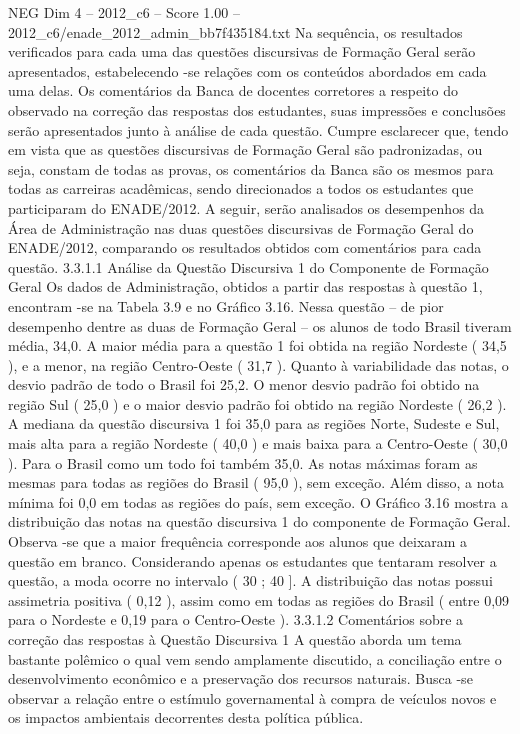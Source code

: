 \begin{textsample}{NEG Dim 4 – 2012\_c6 – Score 1.00 – 2012\_c6/enade\_2012\_admin\_bb7f435184.txt}
Na sequência, os resultados verificados para cada uma das questões discursivas de Formação Geral serão apresentados, estabelecendo -se relações com os conteúdos abordados em cada uma delas.
Os comentários da Banca de docentes corretores a respeito do observado na correção das respostas dos estudantes, suas impressões e conclusões serão apresentados junto à análise de cada questão.
Cumpre esclarecer que, tendo em vista que as questões discursivas de Formação Geral são padronizadas, ou seja, constam de todas as provas, os comentários da Banca são os mesmos para todas as carreiras acadêmicas, sendo direcionados a todos os estudantes que participaram do ENADE/2012.
A seguir, serão analisados os desempenhos da Área de Administração nas duas questões discursivas de Formação Geral do ENADE/2012, comparando os resultados obtidos com comentários para cada questão. 3.3.1.1 Análise da Questão Discursiva 1 do Componente de Formação Geral Os dados de Administração, obtidos a partir das respostas à questão 1, encontram -se na Tabela 3.9 e no Gráfico 3.16.
Nessa questão – de pior desempenho dentre as duas de Formação Geral – os alunos de todo Brasil tiveram média, 34,0.
A maior média para a questão 1 foi obtida na região Nordeste ( 34,5 ), e a menor, na região Centro-Oeste ( 31,7 ).
Quanto à variabilidade das notas, o desvio padrão de todo o Brasil foi 25,2.
O menor desvio padrão foi obtido na região Sul ( 25,0 ) e o maior desvio padrão foi obtido na região Nordeste ( 26,2 ).
A mediana da questão discursiva 1 foi 35,0 para as regiões Norte, Sudeste e Sul, mais alta para a região Nordeste ( 40,0 ) e mais baixa para a Centro-Oeste ( 30,0 ).
Para o Brasil como um todo foi também 35,0.
As notas máximas foram as mesmas para todas as regiões do Brasil ( 95,0 ), sem exceção.
Além disso, a nota mínima foi 0,0 em todas as regiões do país, sem exceção.
O Gráfico 3.16 mostra a distribuição das notas na questão discursiva 1 do componente de Formação Geral.
Observa -se que a maior frequência corresponde aos alunos que deixaram a questão em branco.
Considerando apenas os estudantes que tentaram resolver a questão, a moda ocorre no intervalo ( 30 ; 40 ].
A distribuição das notas possui assimetria positiva ( 0,12 ), assim como em todas as regiões do Brasil ( entre 0,09 para o Nordeste e 0,19 para o Centro-Oeste ). 3.3.1.2 Comentários sobre a correção das respostas à Questão Discursiva 1 A questão aborda um tema bastante polêmico o qual vem sendo amplamente discutido, a conciliação entre o desenvolvimento econômico e a preservação dos recursos naturais.
Busca -se observar a relação entre o estímulo governamental à compra de veículos novos e os impactos ambientais decorrentes desta política pública.

\end{textsample}
